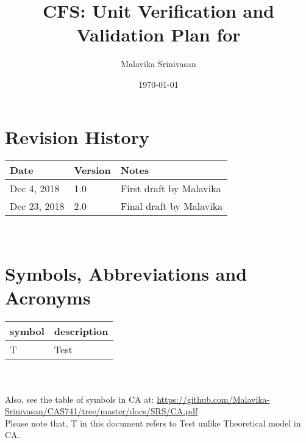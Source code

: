 \documentclass[12pt, titlepage]{article}
\begin{document}
\title{CFS: Unit Verification and Validation Plan for \famname{}} 
\author{Malavika Srinivasan}
\date{\today}
	
\maketitle


\section{Revision History}

\begin{tabularx}{\textwidth}{p{3cm}p{2cm}X}
\toprule {\bf Date} & {\bf Version} & {\bf Notes}\\
\midrule
Dec 4, 2018 & 1.0 & First draft by Malavika\\
Dec 23, 2018 & 2.0 & Final draft by Malavika\\
\bottomrule
\end{tabularx}

~\newpage

\tableofcontents





\newpage

\section{Symbols, Abbreviations and Acronyms}

\renewcommand{\arraystretch}{1.2}
\begin{tabular}{l l} 
	\toprule		
	\textbf{symbol} & \textbf{description}\\
	\midrule 
	T & Test\\
	\bottomrule
\end{tabular}\\
\\



Also, see the table of symbols in CA at: 
\url{https://github.com/Malavika-Srinivasan/CAS741/tree/master/docs/SRS/CA.pdf}
\\
Please note that, T in this document refers to Test unlike Theoretical model in 
CA. \\
\end{document}
